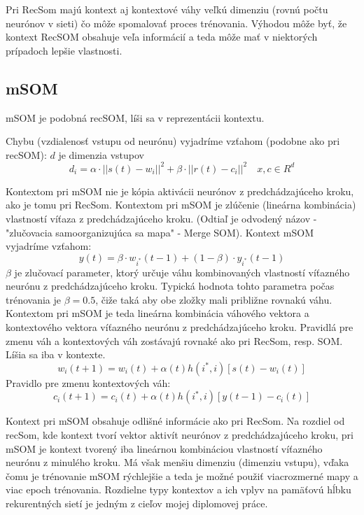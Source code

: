 Pri RecSom majú kontext aj kontextové váhy veľkú dimenziu (rovnú počtu neurónov v sieti) čo môže spomalovať
proces trénovania.
Výhodou môže byť, že kontext RecSOM obsahuje veľa informácií a teda môže mať v niektorých prípadoch
lepšie vlastnosti. 


\subsection{mSOM}
mSOM je podobná recSOM, líši sa v reprezentácii kontextu.

Chybu (vzdialenosť vstupu od neurónu) vyjadríme vzťahom (podobne ako pri recSOM):
$d$ je dimenzia vstupov
\begin{equation}
	d_i = \alpha \cdot ||s(t) - w_i||^{2} + \beta \cdot ||r(t) - c_i||^{2} \quad x, c \in R^{d}
\end{equation}

Kontextom pri mSOM nie je kópia aktivácii neurónov z predchádzajúceho kroku, ako je tomu pri RecSom. 
Kontextom pri mSOM je zlúčenie (lineárna kombinácia) vlastností víťaza z predchádzajúceho kroku.
(Odtiaľ je odvodený názov - "zlučovacia samoorganizujúca sa mapa" - Merge SOM). 
Kontext mSOM vyjadríme vzťahom:
\begin{equation}
	y(t) = \beta \cdot w_{i^{*}}(t-1) + (1 - \beta) \cdot y_{i^{*}}(t-1)
\end{equation}
$\beta$ je zlučovací parameter, ktorý určuje váhu kombinovaných vlastností
víťazného neurónu z predchádzajúceho kroku. Typická hodnota tohto parametra
počas trénovania je $\beta = 0.5$, čiže taká aby obe zložky mali približne 
rovnakú váhu. Kontextom pri mSOM je teda lineárna kombinácia váhového vektora a 
kontextového vektora víťazného neurónu z predchádzajúceho kroku.
Pravidlá pre zmenu váh a kontextových váh zostávajú rovnaké ako pri RecSom, resp. SOM. Líšia sa iba v kontexte.
\begin{equation}
	w_i(t + 1) = w_i(t) + \alpha(t)h(i^*, i)[s(t) - w_i(t)]
\end{equation}
Pravidlo pre zmenu kontextových váh:
\begin{equation}
	c_i(t + 1) = c_i(t) + \alpha(t)h(i^*, i)[y(t - 1) - c_i(t)]
\end{equation}

Kontext pri mSOM obsahuje odlišné informácie ako pri RecSom.
Na rozdiel od recSom, kde kontext tvorí vektor aktivít neurónov z predchádzajúceho kroku, pri
mSOM je kontext tvorený iba lineárnou kombináciou vlastností víťazného neurónu z minulého kroku.
Má však menšiu dimenziu (dimenziu vstupu), vďaka čomu je trénovanie mSOM rýchlejšie a teda je možné použiť 
viacrozmerné mapy a viac epoch trénovania. Rozdielne typy kontextov a ich 
vplyv na pamäťovú hĺbku rekurentných sietí je jedným z cieľov mojej diplomovej práce.









